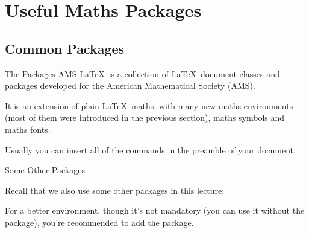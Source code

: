 \section{Useful Maths Packages}

\subsection{Common Packages}

\begin{frame}[fragile]{The  Packages}
AMS-\LaTeX\ is a collection of \LaTeX\ document classes and packages developed for the American Mathematical Society (AMS). \medskip

It is an extension of plain-\LaTeX\ maths, with many new maths environments (most of them were introduced in the previous section), maths symbols and maths fonts. \medskip

Usually you can insert all of the commands in the preamble of your document.

\begin{command}
\begin{LCL}
\usepackage{amsmath}  %
\usepackage{amssymb}  %
\usepackage{amsfonts} %
\end{LCL}
\end{command}

\end{frame}

\begin{frame}[fragile]{Some Other Packages}

Recall that we also use some other packages in this lecture:

\begin{command}
\begin{LCL}
\usepackage{esint}    %
\usepackage{relsize}  %
\end{LCL}
\end{command}

For a better  environment, though it's not mandatory (you can use it without the package), you're recommended to add the  package.

\begin{command}
\begin{LCL}
\usepackage{array}
\end{LCL}
\end{command}

\end{frame}

